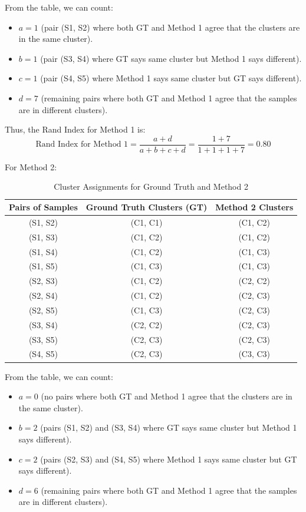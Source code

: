 \documentclass{article}
\begin{document}
\begin{enumerate}
    From the table, we can count:
    \begin{itemize}
        \item $a = 1$ (pair (S1, S2) where both GT and Method 1 agree that the clusters are in the same cluster).
        \item $b = 1$ (pair (S3, S4) where GT says same cluster but Method 1 says different).
        \item $c = 1$ (pair (S4, S5) where Method 1 says same cluster but GT says different).
        \item $d = 7$ (remaining pairs where both GT and Method 1 agree that the samples are in different clusters).
    \end{itemize}
    
    Thus, the Rand Index for Method 1 is:
    \[
    \text{Rand Index for Method 1} = \frac{a + d}{a + b + c + d} = \frac{1+7}{1+1+1+7} = 0.80
    \]
    
    For Method 2:
    \begin{table}[H]
        \centering
        \begin{tabular}{|c|c|c|}
            \hline
            Pairs of Samples & Ground Truth Clusters (GT) & Method 2 Clusters \\ \hline
            (S1, S2) & (C1, C1) & (C1, C2) \\ \hline
            (S1, S3) & (C1, C2) & (C1, C2) \\ \hline
            (S1, S4) & (C1, C2) & (C1, C3) \\ \hline
            (S1, S5) & (C1, C3) & (C1, C3) \\ \hline
            (S2, S3) & (C1, C2) & (C2, C2) \\ \hline
            (S2, S4) & (C1, C2) & (C2, C3) \\ \hline
            (S2, S5) & (C1, C3) & (C2, C3) \\ \hline
            (S3, S4) & (C2, C2) & (C2, C3) \\ \hline
            (S3, S5) & (C2, C3) & (C2, C3) \\ \hline
            (S4, S5) & (C2, C3) & (C3, C3) \\ \hline
        \end{tabular}
        \caption{Cluster Assignments for Ground Truth and Method 2}
    \end{table}
    
    From the table, we can count:
    \begin{itemize}
        \item $a = 0$ (no pairs where both GT and Method 1 agree that the clusters are in the same cluster).
        \item $b = 2$ (pairs (S1, S2) and (S3, S4) where GT says same cluster but Method 1 says different).
        \item $c = 2$ (pairs (S2, S3) and (S4, S5) where Method 1 says same cluster but GT says different).
        \item $d = 6$ (remaining pairs where both GT and Method 1 agree that the samples are in different clusters).
    \end{itemize}
    

\end{enumerate}
\end{document}
